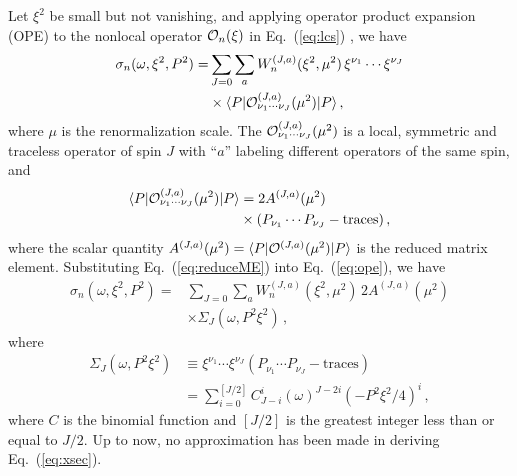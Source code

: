 \documentclass[twocolumn,aps,prl,superscriptaddress,nofootinbib,showpacs]{revtex4-1}
\begin{document}
Let $\xi^2$ be small but not vanishing, and applying operator product expansion (OPE) to the nonlocal operator ${\cal O}_n(\xi)$ in Eq.~(\ref{eq:lcs}) \cite{Collins:1984xc}, we have
\begin{align}\label{eq:ope}
{\sigma}_{n}(\omega,\xi^2,P^2)=&\sum_{J=0}\sum_a W_{n}^{(J,a)}(\xi^2,\mu^2)\, \xi^{\nu_1}\cdots\xi^{\nu_J}\nonumber\\
&\times\langle P|{\cal O}^{(J,a)}_{\nu_1\cdots\nu_J}(\mu^2)|P\rangle\, ,
\end{align}
where $\mu$ is the renormalization scale.  The ${\cal O}^{(J,a)}_{\nu_1\cdots\nu_J}(\mu^2)$ is a local, symmetric and traceless operator of spin $J$ with ``$a$'' labeling different operators of the same spin, and
\begin{align}\label{eq:reduceME}
\langle P|{\cal O}^{(J,a)}_{\nu_1\cdots\nu_J}(\mu^2)|P\rangle&=2A^{(J,a)}(\mu^2)\nonumber \\
&\times(P_{\nu_1}\cdots P_{\nu_J}-\text{traces})\, ,
\end{align}
where the scalar quantity $A^{(J,a)}(\mu^2)=\langle P|{\cal O}^{(J,a)}(\mu^2)|P\rangle$ is the reduced matrix element.
Substituting Eq.~(\ref{eq:reduceME}) into Eq.~(\ref{eq:ope}), we have
\begin{align}\label{eq:xsec}
{\sigma}_{n}(\omega,\xi^2,P^2)=&\sum_{J=0} \sum_aW_{n}^{(J,a)}(\xi^2,\mu^2)\,
2A^{(J,a)}(\mu^2)\nonumber\\
&\times \Sigma_J(\omega,P^2\xi^2)\, ,
\end{align}
where
\begin{align}\label{eq:coeJ}
\Sigma_J(\omega,P^2\xi^2)&\equiv \xi^{\nu_1}\cdots\xi^{\nu_J} (P_{\nu_1}\cdots P_{\nu_J}-\text{traces})\nonumber\\
&=\sum_{i=0}^{[J/2]} C_{J-i}^i (\omega)^{J-2i} \left(-P^2\xi^2/4\right)^i\, ,
\end{align}
where $C$ is the binomial function and $[J/2]$ is the greatest integer less than or equal to $J/2$. Up to now, no approximation has been made in deriving Eq.~(\ref{eq:xsec}).
\end{document}
